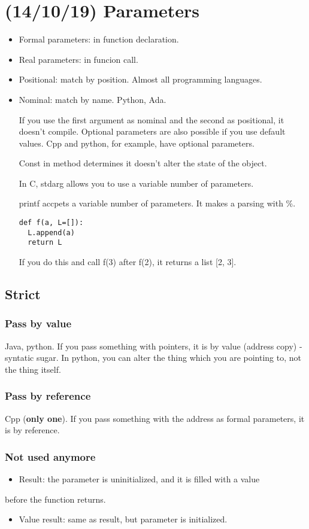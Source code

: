 \documentclass[11pt]{article}
\begin{document}
\section{(14/10/19) Parameters}
\label{sec:orgbaef0a1}
\begin{itemize}
\item Formal parameters: in function declaration.
\item Real parameters: in funcion call.

\item Positional: match by position. Almost all programming languages.
\item Nominal: match by name. Python, Ada.

If you use the first argument as nominal and the second as positional, it doesn't
compile. Optional parameters are also possible if you use default values. Cpp and
python, for example, have optional parameters.

Const in method determines it doesn't alter the state of the object.

In C, stdarg allows you to use a variable number of parameters.

printf accpets a variable number of parameters. It makes a parsing with \%.
\begin{verbatim}
def f(a, L=[]):
  L.append(a)
  return L
\end{verbatim}
If you do this and call f(3) after f(2), it returns a list [2, 3].
\end{itemize}
\subsection{Strict}
\label{sec:org376ec5e}
\subsubsection{Pass by value}
\label{sec:orgaf41ce6}
Java, python. If you pass something with pointers, it is by value (address copy) -
syntatic sugar. In python, you can alter the thing which you are pointing to, not the
thing itself.
\subsubsection{Pass by reference}
\label{sec:org3e4d0aa}
Cpp (\textbf{only one}). If you pass something with the address as formal parameters, it is by
reference.
\subsubsection{Not used anymore}
\label{sec:org87d3631}
\begin{itemize}
\item Result: the parameter is uninitialized, and it is filled with a value
\end{itemize}
before the function returns.
\begin{itemize}
\item Value result: same as result, but parameter is initialized.
\end{itemize}
\end{document}
